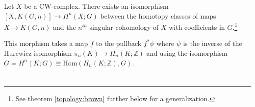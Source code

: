     \begin{property}[Representability]
        Let $X$ be a CW-complex. There exists an isomorphism $[X, K(G, n)]\rightarrow H^n(X; G)$ between the homotopy classes of maps $X\rightarrow K(G, n)$ and the $n^{th}$ singular cohomology of $X$ with coefficients in $G$.\footnote{See theorem \ref{topology:brown} further below for a generalization.}

        This morphism takes a map $f$ to the pullback $f^*\psi$ where $\psi$ is the inverse of the Hurewicz isomorphism $\pi_n(K)\rightarrow H_n(K;\mathbb{Z})$ and using the isomorphism $G=H^n(K;G)\cong\text{Hom}(H_n(K;\mathbb{Z}), G)$.
    \end{property}

\section{}

